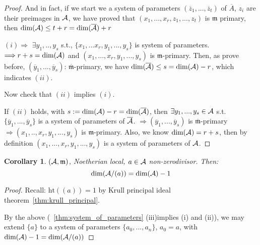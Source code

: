 \documentclass[11pt]{article}
\newtheorem{cor}[thm]{Corollary}
\newcommand{\scm}{{\mathfrak m}}
\newcommand{\cala}{{\cal A}}
\newcommand{\Lrta}{\Longrightarrow}
\begin{document}
\begin{proof}
And in fact, if we start we a system of parameters $(\overline{z}_1,...,\overline{z}_t)$ of $\overline{A}$, $z_i$ are their preimages in $\cala$, we have proved that $(x_1,...,x_r,z_1,...,z_t)$ is $\scm$ primary, then $\text{dim}(\cala)\leq t+r= \text{dim}(\overline{\cala})+r$

$(i)\Lrta$ $\exists y_1,..,y_s$ s.t., $\{x_1,...x_r,y_1,...,y_s\}$ is system of parameters.
$\Lrta r+s=\text{dim}(\cala)$ and $(x_1,...,x_r,y_1,...,y_s)$ is $\scm$-primary. Then, as prove before, $(\overline{y}_1,...,\overline{y}_s)$: $\overline{\scm}$-primary, we have $\text{dim}(\overline{\cala})\leq s=\text{dim}(\cala)-r$, which indicates $(ii)$.

Now check that $(ii)$ implies $(i)$.

If $(ii)$ holds, with $s:=\text{dim}(\cala)-r=\text{dim}(\overline{\cala})$, then $\exists y_1,...,y_s\in\cala$ s.t. $\{\overline{y}_1,...,\overline{y}_s\}$ is a system of parameters of $\overline{\cala}$. $\Lrta(\overline{y}_1,...,\overline{y}_s)$ is $\overline{\scm}$-primary $\Lrta (x_1,..,x_r,y_1,...,y_s)$ is $\scm$-primary. Also, we know $\text{dim}(\cala)=r+s$, then by definition $(x_1,...,x_r,y_1,...,y_s)$ is a system of parameters of $\cala$. 
\end{proof}

\begin{cor}
$(\cala,\scm)$, Noetherian local, $a\in\cala$ non-zerodivisor. Then:
 $$
 \text{dim}(\cala/(a))=\text{dim}(\cala)-1
 $$
\end{cor}
\begin{proof}
Recall: $\text{ht}((a))=1$ by Krull principal ideal theorem~\ref{thm:krull_principal}.

By the above (~\ref{thm:system_of_parameters} (iii)implies (i) and (ii)), we may extend $\{a\}$ to a system of parameters $\{a_0,...,a_n\}$, $a_0=a$, with $\text{dim}(\cala)-1=\text{dim}(\cala/(a))$
\end{proof}
\end{document}

